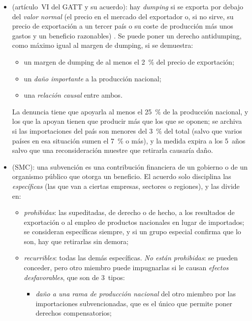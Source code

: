 \documentclass[11pt]{article}
\begin{document}
\begin{itemize}
\item {} (artículo~VI del GATT y su acuerdo): hay \emph{dumping} si se exporta por debajo del \emph{valor normal} (el precio en el mercado del exportador o, si no sirve, su precio de exportación a un tercer país o su coste de producción más unos gastos y un beneficio razonables) . Se puede poner un derecho antidumping, como máximo igual al margen de dumping, si se demuestra:
  \begin{itemize}
  \item un margen de dumping de al menos el 2~\% del precio de exportación;
  \item un \emph{daño importante} a la producción nacional;
  \item una \emph{relación causal} entre ambos.
  \end{itemize}
  La denuncia tiene que apoyarla al menos el 25~\% de la producción nacional, y los que la apoyan tienen que producir más que los que se oponen; se archiva si las importaciones del país son menores del 3~\% del total (salvo que varios países en esa situación sumen el 7~\% o más), y la medida expira a los 5~años salvo que una reconsideración muestre que retirarla causaría daño\nocite{OMC1994Antidumping,OMC2026EntenderDefensa}.
\item {} (SMC): una subvención es una contribución financiera de un gobierno o de un organismo público que otorga un beneficio. El acuerdo solo disciplina las \emph{específicas} (las que van a ciertas empresas, sectores o regiones), y las divide en\nocite{OMC1994SMC,OMC2026SubvencionesPagina}:
  \begin{itemize}
  \item \emph{prohibidas}: las supeditadas, de derecho o de hecho, a los resultados de exportación o al empleo de productos nacionales en lugar de importados; se consideran específicas siempre, y si un grupo especial confirma que lo son, hay que retirarlas sin demora;
  \item \emph{recurribles}: todas las demás específicas. \emph{No están prohibidas}: se pueden conceder, pero otro miembro puede impugnarlas si le causan \emph{efectos desfavorables}, que son de 3~tipos:
    \begin{itemize}
    \item \emph{daño a una rama de producción nacional} del otro miembro por las importaciones subvencionadas, que es el único que permite poner derechos compensatorios;

\end{itemize}
\end{itemize}
\end{itemize}
\end{document}
